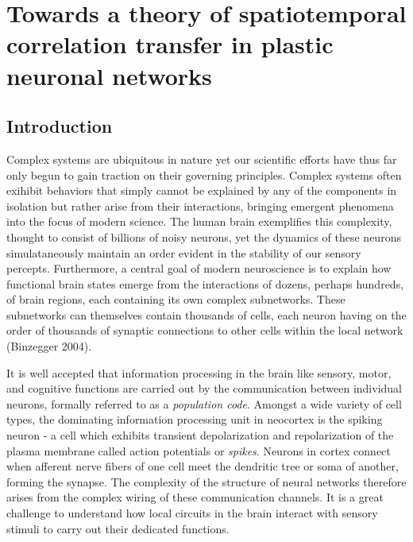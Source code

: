 \documentclass{ucetd}
\begin{document}
\mainmatter

\chapter{Towards a theory of spatiotemporal correlation transfer in plastic neuronal networks}

\section{Introduction}

Complex systems are ubiquitous in nature yet our scientific efforts have thus far only begun to gain traction on their governing principles. Complex systems often exihibit behaviors that simply cannot be explained by any of the components in isolation but rather arise from their interactions, bringing emergent phenomena into the focus of modern science. The human brain exemplifies this complexity, thought to consist of billions of noisy neurons, yet the dynamics of these neurons simulataneously maintain an order evident in the stability of our sensory percepts. Furthermore, a central goal of modern neuroscience is to explain how functional brain states emerge from the interactions of dozens, perhaps hundreds, of brain regions, each containing its own complex subnetworks.  These subnetworks can themselves contain thousands of cells, each neuron having on the order of thousands of synaptic connections to other cells within the local network (Binzegger 2004).

It is well accepted that information processing in the brain like sensory, motor, and cognitive functions are carried out by the communication between individual neurons, formally referred to as a \emph{population code}. Amongst a wide variety of cell types, the dominating information processing unit in neocortex is the spiking neuron - a  cell which exhibits transient depolarization and repolarization of the plasma membrane called action potentials or \emph{spikes}.  Neurons in cortex connect when afferent nerve fibers of one cell meet the dendritic tree or soma of another, forming the synapse. The complexity of the structure of neural networks therefore arises from the complex wiring of these communication channels. It is a great challenge to understand how local circuits in the brain interact with sensory stimuli to carry out their dedicated functions.
\end{document}

